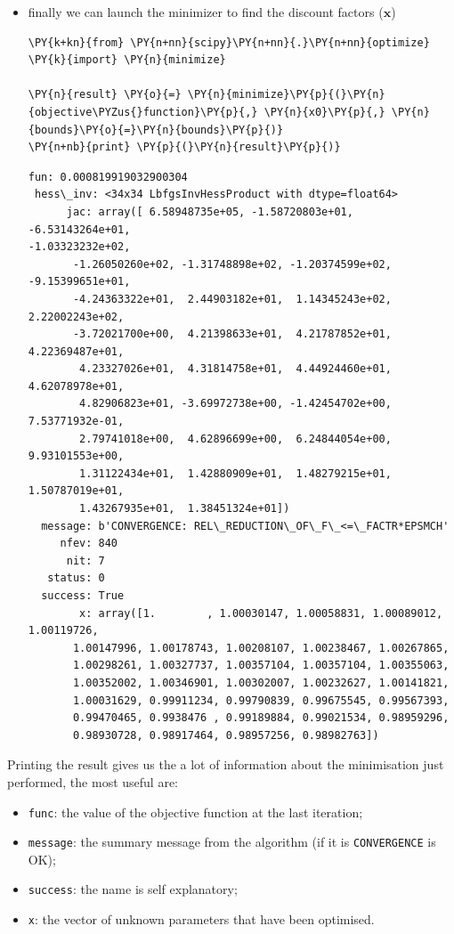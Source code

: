 \begin{itemize}
\item
  finally we can launch the minimizer to find the discount factors
  (\(\mathbf{x}\))

    \begin{tcolorbox}[breakable, size=fbox, boxrule=1pt, pad at break*=1mm,colback=cellbackground, colframe=cellborder]
\begin{Verbatim}[commandchars=\\\{\}]
\PY{k+kn}{from} \PY{n+nn}{scipy}\PY{n+nn}{.}\PY{n+nn}{optimize} \PY{k}{import} \PY{n}{minimize}

\PY{n}{result} \PY{o}{=} \PY{n}{minimize}\PY{p}{(}\PY{n}{objective\PYZus{}function}\PY{p}{,} \PY{n}{x0}\PY{p}{,} \PY{n}{bounds}\PY{o}{=}\PY{n}{bounds}\PY{p}{)}
\PY{n+nb}{print} \PY{p}{(}\PY{n}{result}\PY{p}{)}
\end{Verbatim}
\end{tcolorbox}

    \begin{Verbatim}[commandchars=\\\{\}]
      fun: 0.000819919032900304
 hess\_inv: <34x34 LbfgsInvHessProduct with dtype=float64>
      jac: array([ 6.58948735e+05, -1.58720803e+01, -6.53143264e+01,
-1.03323232e+02,
       -1.26050260e+02, -1.31748898e+02, -1.20374599e+02, -9.15399651e+01,
       -4.24363322e+01,  2.44903182e+01,  1.14345243e+02,  2.22002243e+02,
       -3.72021700e+00,  4.21398633e+01,  4.21787852e+01,  4.22369487e+01,
        4.23327026e+01,  4.31814758e+01,  4.44924460e+01,  4.62078978e+01,
        4.82906823e+01, -3.69972738e+00, -1.42454702e+00,  7.53771932e-01,
        2.79741018e+00,  4.62896699e+00,  6.24844054e+00,  9.93101553e+00,
        1.31122434e+01,  1.42880909e+01,  1.48279215e+01,  1.50787019e+01,
        1.43267935e+01,  1.38451324e+01])
  message: b'CONVERGENCE: REL\_REDUCTION\_OF\_F\_<=\_FACTR*EPSMCH'
     nfev: 840
      nit: 7
   status: 0
  success: True
        x: array([1.        , 1.00030147, 1.00058831, 1.00089012, 1.00119726,
       1.00147996, 1.00178743, 1.00208107, 1.00238467, 1.00267865,
       1.00298261, 1.00327737, 1.00357104, 1.00357104, 1.00355063,
       1.00352002, 1.00346901, 1.00302007, 1.00232627, 1.00141821,
       1.00031629, 0.99911234, 0.99790839, 0.99675545, 0.99567393,
       0.99470465, 0.9938476 , 0.99189884, 0.99021534, 0.98959296,
       0.98930728, 0.98917464, 0.98957256, 0.98982763])
    \end{Verbatim}
\end{itemize}

Printing the result gives us the a lot of information about the minimisation just performed, the most useful are:
\begin{itemize}
\item \texttt{func}: the value of the objective function at the last iteration;
\item \texttt{message}: the summary message from the algorithm (if it is \texttt{CONVERGENCE} is OK);
\item \texttt{success}: the name is self explanatory;
\item \texttt{x}: the vector of unknown parameters that have been optimised.
\end{itemize}

